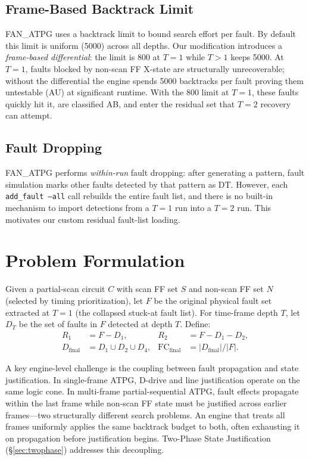 \documentclass[conference]{IEEEtran}
\begin{document}
\subsection{Frame-Based Backtrack Limit}
FAN\_ATPG uses a backtrack limit to bound search effort per fault. By default
this limit is uniform (5000) across all depths. Our
modification introduces a \emph{frame-based differential}: the limit is
800 at $T{=}1$ while $T{>}1$ keeps 5000. At $T{=}1$, faults blocked by non-scan FF
X-state are structurally unrecoverable; without the differential the engine
spends 5000 backtracks per fault proving them untestable (AU) at significant
runtime. With the 800 limit at $T{=}1$, these faults quickly hit it, are classified AB,
and enter the residual set that $T{=}2$ recovery can attempt.

\subsection{Fault Dropping}
FAN\_ATPG performs \emph{within-run} fault dropping: after generating a pattern,
fault simulation marks other faults detected by that pattern as DT. However,
each \texttt{add\_fault --all} call rebuilds the entire fault list, and there is
no built-in mechanism to import detections from a $T{=}1$ run into a $T{=}2$
run. This motivates our custom residual fault-list loading.

\section{Problem Formulation}
\label{sec:formulation}
Given a partial-scan circuit $C$ with scan FF set $S$ and non-scan FF set $N$
(selected by timing prioritization), let $F$ be the original physical fault set
extracted at $T{=}1$ (the collapsed stuck-at fault list). For time-frame depth
$T$, let $D_T$ be the set of faults in $F$ detected at depth $T$. Define:
\begin{align*}
R_1 &= F - D_1, & R_2 &= F - D_1 - D_2,\\
D_{\text{final}} &= D_1 \cup D_2 \cup D_4, & \mathrm{FC}_{\text{final}} &= |D_{\text{final}}|/|F|.
\end{align*}

A key engine-level challenge is the coupling between fault propagation and state
justification. In single-frame ATPG, D-drive and line justification operate on
the same logic cone. In multi-frame partial-sequential ATPG, fault effects
propagate within the last frame while non-scan FF state must be justified across
earlier frames---two structurally different search problems. An engine that
treats all frames uniformly applies the same backtrack budget to both, often
exhausting it on propagation before justification begins. Two-Phase State
Justification (\S\ref{sec:twophase}) addresses this decoupling.
\end{document}
